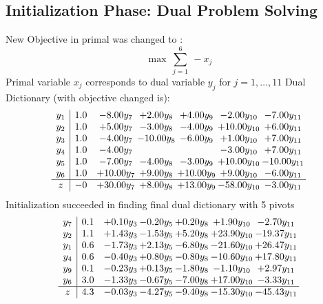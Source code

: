 \documentclass[8pt]{article}
\begin{document}
\subsection{Initialization Phase: Dual Problem Solving}
New Objective in primal was changed to : \[ \max\ \sum_{j=1}^{6}\ - x_j \] 
Primal variable $x_j$ corresponds to dual variable $y_j$ for $j = 1,\ldots,11$
Dual Dictionary (with objective changed is): 
\[\begin{array}{c| c c@{\hskip 2pt} c@{\hskip 2pt} c@{\hskip 2pt} c@{\hskip 2pt} c@{\hskip 2pt} }
 y_{1}   &  1.0 & -8.00 y_{7} & +  2.00 y_{8} & +  4.00 y_{9} & -2.00 y_{10} & -7.00 y_{11}\\
 y_{2}   &  1.0 & +  5.00 y_{7} & -3.00 y_{8} & -4.00 y_{9} & + 10.00 y_{10} & +  6.00 y_{11}\\
 y_{3}   &  1.0 & -4.00 y_{7} & -10.00 y_{8} & -6.00 y_{9} & +  1.00 y_{10} & +  7.00 y_{11}\\
 y_{4}   &  1.0 & -4.00 y_{7} &    &   & -3.00 y_{10} & +  7.00 y_{11}\\
 y_{5}   &  1.0 & -7.00 y_{7} & -4.00 y_{8} & -3.00 y_{9} & + 10.00 y_{10} & -10.00 y_{11}\\
 y_{6}   &  1.0 & + 10.00 y_{7} & +  9.00 y_{8} & + 10.00 y_{9} & +  9.00 y_{10} & -6.00 y_{11}\\
\hline
z    &  -0 & + 30.00 y_{7} & +  8.00 y_{8} & + 13.00 y_{9} & -58.00 y_{10} & -3.00 y_{11}\\
\end{array}\]
Initialization succeeded in finding final dual dictionary with 5 pivots
\[\begin{array}{c| c c@{\hskip 2pt} c@{\hskip 2pt} c@{\hskip 2pt} c@{\hskip 2pt} c@{\hskip 2pt} }
 y_{7}   &  0.1 & +  0.10 y_{3} & -0.20 y_{5} & +  0.20 y_{8} & +  1.90 y_{10} & -2.70 y_{11}\\
 y_{2}   &  1.1 & +  1.43 y_{3} & -1.53 y_{5} & +  5.20 y_{8} & + 23.90 y_{10} & -19.37 y_{11}\\
 y_{1}   &  0.6 & -1.73 y_{3} & +  2.13 y_{5} & -6.80 y_{8} & -21.60 y_{10} & + 26.47 y_{11}\\
 y_{4}   &  0.6 & -0.40 y_{3} & +  0.80 y_{5} & -0.80 y_{8} & -10.60 y_{10} & + 17.80 y_{11}\\
 y_{9}   &  0.1 & -0.23 y_{3} & +  0.13 y_{5} & -1.80 y_{8} & -1.10 y_{10} & +  2.97 y_{11}\\
 y_{6}   &  3.0 & -1.33 y_{3} & -0.67 y_{5} & -7.00 y_{8} & + 17.00 y_{10} & -3.33 y_{11}\\
\hline
z    &  4.3 & -0.03 y_{3} & -4.27 y_{5} & -9.40 y_{8} & -15.30 y_{10} & -45.43 y_{11}\\
\end{array}\]
\end{document}

